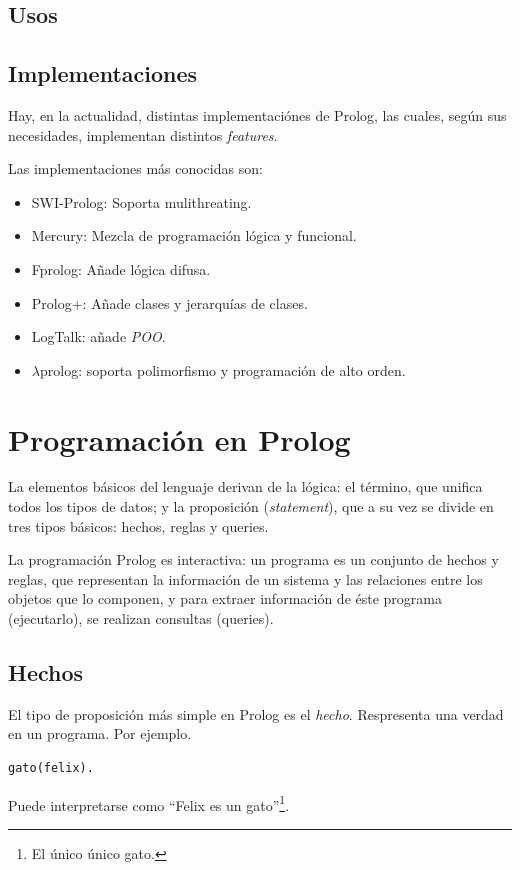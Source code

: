\documentclass[12pt,titlepage]{article}
\begin{document}
\subsection{Usos}
\subsection{Implementaciones}

Hay, en la actualidad, distintas implementaciónes de Prolog, las cuales, según sus necesidades, implementan distintos \textit{features}.


Las implementaciones más conocidas son:
\begin{itemize}
    \item SWI-Prolog: Soporta mulithreating.
    \item Mercury: Mezcla de programación lógica y funcional.
    \item Fprolog: Añade lógica difusa.
    \item Prolog+: Añade clases y jerarquías de clases.
    \item LogTalk: añade \textit{POO}.
    \item $\lambda$prolog: soporta polimorfismo y programación de alto orden.
\end{itemize}

\newpage
\section{Programación en Prolog}

La elementos básicos del lenguaje derivan de la lógica: el término, que unifica todos los tipos de datos; y la proposición (\emph{statement}), que a su vez se divide en tres tipos básicos: hechos, reglas y queries.

La programación Prolog es interactiva: un programa es un conjunto de hechos y reglas, que representan la información de un sistema y las relaciones entre los objetos que lo componen, y para extraer información de éste programa (ejecutarlo), se realizan consultas (queries). 

\subsection{Hechos}

El tipo de proposición más simple en Prolog es el \emph{hecho}. Respresenta una verdad en un programa. Por ejemplo.
\begin{lstlisting}
gato(felix).
\end{lstlisting}
Puede interpretarse como ``Felix es un gato''\footnote{El único único gato.}.
\end{document}
